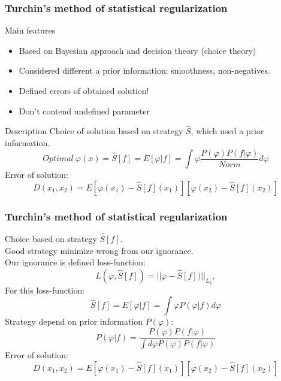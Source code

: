 \documentclass[8pt,pdf,hyperref={unicode}]{beamer}
\begin{document}
\begin{frame}[squeeze]
    \frametitle{Turchin's method of statistical regularization }
    \begin{block}{Main features}
    {\LARGE     \begin{itemize}
        \item Based on Bayesian approach and decision theory (choice theory)\\
        \item Considered different a prior information: smoothness, non-negatives. \\
        \item Defined errors of obtained solution!\\
        \item Don't contend undefined parameter\\
    \end{itemize}}
    \end{block}
    \begin{block}{Description}
{\LARGE         Choice of solution based on strategy $\hat{S}$, which used a prior information.
        $$
        Optimal~ \varphi(x) = \hat{S}[f] = E[\varphi|f] = \int \varphi  \frac{P(\varphi)P(f|\varphi)}{Norm}d\varphi
        $$
        Error of solution:
        $$
        D(x_1,x_2)  = E[\varphi(x_1) - \hat{S}[f](x_1)][\varphi(x_2) - \hat{S}[f](x_2)]
        $$}
    \end{block}
\end{frame}

\begin{frame}
    \frametitle{Turchin's method of statistical regularization}
{\LARGE     Choice based on strategy $\hat{S}[f]$.\\
    Good strategy minimize wrong from our ignorance.\\
    Our ignorance is defined loss-function:
    $$
    L(\varphi,\hat{S}[f]) = ||\varphi-\hat{S}[f])||_{L_2},
    $$
    For this loss-function:
    $$
    \hat{S}[f] = E[\varphi|f] = \int \varphi P(\varphi|f)d\varphi
    \label{eq:opt}
    $$
    Strategy depend on prior information $P(\varphi)$:
    $$
    P(\varphi|f)= \frac{P(\varphi)P(f|\varphi)}{\int d\varphi P(\varphi)P(f|\varphi)} 
    $$
    Error of solution:
    $$
    D(x_1,x_2)  = E[\varphi(x_1) - \hat{S}[f](x_1)][\varphi(x_2) - \hat{S}[f](x_2)]
    $$}
    
\end{frame}
\end{document}
